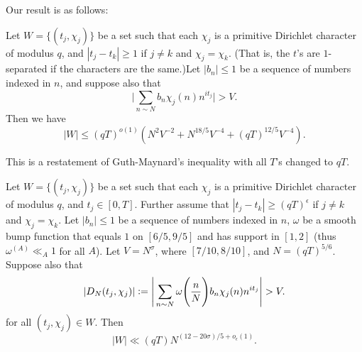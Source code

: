 Our result is as follows: 
\begin{theorem}\label{incompletehybrid}
	Let $W=\{(t_j,\chi_j)\}$ be a set such that each $\chi_j$ is a primitive Dirichlet character of modulus $q$, and $|t_j-t_k|\geq 1$ if $j\neq k$ and $\chi_j=\chi_k$. (That is, the $t$'s are $1$-separated if the characters are the same.)Let $|b_n|\leq 1$ be a sequence of numbers indexed in $n$, and suppose also that \[
	\Bigg|\sum_{n\sim N} b_n\chi_j(n)n^{it_j} \Bigg|>V.
	\]
Then we have  \[
	|W|\leq (qT)^{o(1)}(N^2V^{-2}+ N^{18/5}V^{-4}+(qT)^{12/5}V^{-4} ).
	\]
\end{theorem}
\begin{remark}
This is a restatement of Guth-Maynard's inequality with all $T$'s changed to $qT$.
\end{remark}
\begin{proposition}\label{mainthm}
    Let $W=\{(t_j,\chi_j)\}$ be a set such that each $\chi_j$ is a primitive Dirichlet character of modulus $q$, and $t_j\in[0,T]$. Further assume that $|t_j-t_k|\geq (qT)^\epsilon$ if $j\neq k$ and $\chi_j=\chi_k$. Let $|b_n|\leq 1$ be a sequence of numbers indexed in $n$, $\omega$ be a smooth bump function that equals $1$ on $[6/5,9/5]$ and has support in $[1,2]$ (thus $\omega^{(A)}\ll_A 1$ for all $A$). Let $V=N^{\sigma}$, where $[7/10,8/10]$, and $N=(qT)^{5/6}$. Suppose also that \[
    |D_N(t_j,\chi_j)|\defeq\Bigg|\sum_{n\sim N} \omega\Bigg(\frac{n}{N}\Bigg)b_n\chi_j(n)n^{it_j} \Bigg|>V.
\]
for all $(t_j,\chi_j)\in W$.
Then \[
|W|\ll (qT)N^{(12-20\sigma)/5+o_{\epsilon}(1)}.
\]
\end{proposition}
